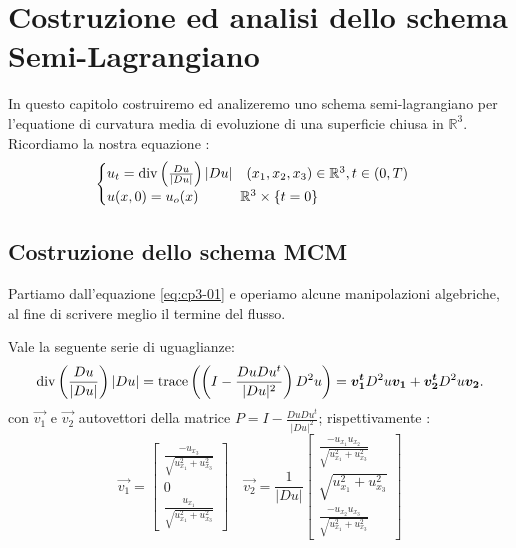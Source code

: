 \chapter{Costruzione ed analisi dello schema Semi-Lagrangiano}
In questo capitolo costruiremo ed analizeremo uno schema semi-lagrangiano per l'equatione di curvatura media di evoluzione di una superficie chiusa in $\mathbb{R}^3$.
Ricordiamo la nostra equazione :
\begin{equation}
\label{eq:cp3-01}
\begin{cases}
u_t = \operatorname{div}\left(\frac{Du}{|Du|}\right)|Du|\quad (x_1,x_2,x_3)\in\mathbb{R}^3,t\in(0,T) \\
u(x,0) = u_o(x) \qquad \quad \mathbb{R}^3\times\{t = 0\}
\end{cases}
\end{equation}
\section{Costruzione dello schema MCM}
Partiamo dall'equazione \eqref{eq:cp3-01} e operiamo alcune manipolazioni algebriche, al fine di scrivere meglio il termine del flusso. 
\begin{proposizione}
Vale la seguente serie di uguaglianze:
\[
\operatorname{div}\left(\frac{Du}{|Du|}\right)|Du|=\operatorname{trace}\left(\left(I-\frac{DuDu^t}{|Du|^2}\right)D^2u\right)=\bm{v_1^t}D^2u\bm{v_1}+\bm{v_2^t}D^2u\bm{v_2}.
\]
con $\vec{v_1}$ e $\vec{v_2}$ autovettori della matrice $P=I-\frac{DuDu^t}{|Du|^2}$; rispettivamente :
\[
\vec{v_1}=
\begin{bmatrix}
\frac{-u_{x_3}}{\sqrt{u_{x_1}^2+u_{x_3}^2}} \\
0 \\
\frac{u_{x_1}}{\sqrt{u_{x_1}^2+u_{x_3}^2}}
\end{bmatrix}
\quad
\vec{v_2}=\frac{1}{|Du|}
\begin{bmatrix}
\frac{-u_{x_1}u_{x_2}}{\sqrt{u_{x_1}^2+u_{x_3}^2}} \\
\sqrt{u_{x_1}^2+u_{x_3}^2} \\
\frac{-u_{x_2}u_{x_3}}{\sqrt{u_{x_1}^2+u_{x_3}^2}}
\end{bmatrix}
\]
\end{proposizione}
